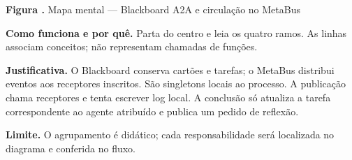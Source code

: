 {\small\textbf{Figura \thefigure.} Mapa mental --- Blackboard A2A e circulação no MetaBus}\par\smallskip
\noindent\textbf{Como funciona e por quê.} Parta do centro e leia os quatro ramos. As linhas associam conceitos; não representam chamadas de funções.\par
\noindent\textbf{Justificativa.} O Blackboard conserva cartões e tarefas; o MetaBus distribui eventos aos receptores inscritos. São singletons locais ao processo. A publicação chama receptores e tenta escrever log local. A conclusão só atualiza a tarefa correspondente ao agente atribuído e publica um pedido de reflexão.\par
\noindent\textbf{Limite.} O agrupamento é didático; cada responsabilidade será localizada no diagrama e conferida no fluxo.\par\smallskip
{}
